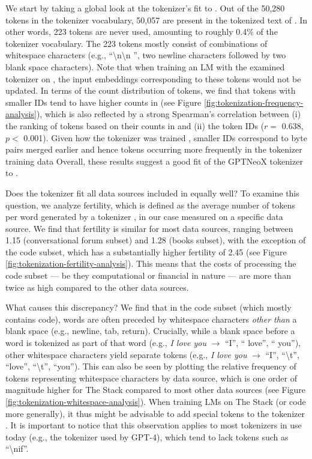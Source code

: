 We start by taking a global look at the tokenizer's fit to \dolma. Out of the 50,280 tokens in the tokenizer vocabulary, 50,057 are present in the tokenized text of \dolma. In other words, 223 tokens are never used, amounting to roughly 0.4\% of the tokenizer vocabulary. The 223 tokens mostly consist of combinations of whitespace characters (e.g., ``\textbackslash n\textbackslash n {} '', two newline characters followed by two blank space characters). Note that when training an LM with the examined tokenizer on \dolma, the input embeddings corresponding to these tokens would not be updated. 
In terms of the count distribution of tokens, we find that tokens with smaller IDs tend to have higher counts in \dolma (see Figure \ref{fig:tokenization-frequency-analysis}), which is also reflected by a strong Spearman's correlation between (i) the ranking of tokens based on their counts in \dolma and (ii) the token IDs ($r =$ 0.638, $p <$ 0.001). Given how the tokenizer was trained \citep{sennrich-etal-2016-neural, Black2022GPTNeoX20BAO}, smaller IDs correspond to byte pairs merged earlier and hence tokens occurring more frequently in the tokenizer training data 
Overall, these results suggest a good fit of the GPTNeoX tokenizer to \dolma. 


Does the tokenizer fit all data sources included in \dolma equally well? To examine this question, we analyze fertility, which is defined as the average number of tokens per word generated by a tokenizer \citep{acs2019,Scao2022BLOOMA1}, in our case measured on a specific data source.
We find that fertility is similar for most data sources, ranging between 1.15 (conversational forum subset) and 1.28 (books subset), with the exception of the code subset, which has a substantially higher fertility of 2.45 (see Figure \ref{fig:tokenization-fertility-analysis}). This means that the costs of processing the code subset --- be they computational or financial in nature \citep{petrov2023language} --- are more than twice as high compared to the other data sources. 

What causes this discrepancy? We find that in the code subset (which mostly contains code), words are often preceded by whitespace characters \emph{other than} 
a blank space (e.g., newline, tab, return). Crucially, while a blank space before a word is tokenized as part of that word (e.g., \textit{I love you} $\rightarrow$ ``I'', `` love'', `` you''), other whitespace characters yield separate tokens (e.g., \textit{I \quad love \quad you} $\rightarrow$ ``I'', ``\textbackslash t'', ``love'', ``\textbackslash t'', ``you''). This can also be seen by plotting the relative frequency of tokens representing whitespace characters by data source, which is one order of magnitude higher for The Stack compared to most other data sources (see Figure \ref{fig:tokenization-whitespace-analysis}). When training LMs on The Stack (or code more generally), it thus might be advisable to add special tokens to the tokenizer \citep[e.g., ``\textbackslash nif'';][]{hong-etal-2021-avocado}. It is important to notice that this observation applies to most tokenizers in use today (e.g., the tokenizer used by GPT-4), which tend to lack tokens such as ``\textbackslash nif''.

